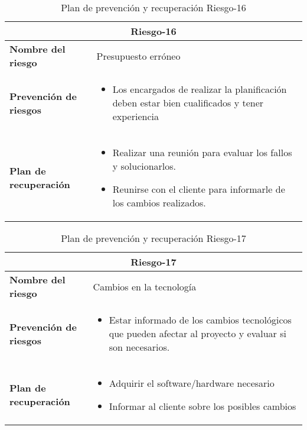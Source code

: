 \begin{table}[H]
\begin{center}
\begin{tabular}{p{} p{10cm}}
\multicolumn{2}{c}{\textbf{Riesgo-16} } \\
\hline \hline
\textbf{Nombre del riesgo} & Presupuesto erróneo  \\
\hline
\textbf{Prevención de riesgos} & \begin{itemize}[-]
  \item Los encargados de realizar la planificación deben estar bien cualificados y tener experiencia
  \end{itemize} \\
\hline
\textbf{Plan de recuperación} &   \begin{itemize}[-]
  \item Realizar una reunión para evaluar los fallos y solucionarlos.
  \item Reunirse con el cliente para informarle de los cambios realizados.
  \end{itemize}\\
\hline
\end{tabular}
\caption{Plan de prevención y recuperación Riesgo-16}
\label{tab:Riesgo-16-Prev_Recup}
\end{center}
\end{table}

\begin{table}[H]
\begin{center}
\begin{tabular}{p{} p{10cm}}
\multicolumn{2}{c}{\textbf{Riesgo-17} } \\
\hline \hline
\textbf{Nombre del riesgo} & Cambios en la tecnología \\
\hline
\textbf{Prevención de riesgos} & \begin{itemize}[-]
  \item Estar informado de los cambios tecnológicos que pueden afectar al proyecto y evaluar si son necesarios.
  \end{itemize} \\
\hline
\textbf{Plan de recuperación} &   \begin{itemize}[-]
  \item Adquirir el software/hardware necesario
  \item Informar al cliente sobre los posibles cambios
  \end{itemize}\\
\hline
\end{tabular}
\caption{Plan de prevención y recuperación Riesgo-17}
\label{tab:Riesgo-17-Prev_Recup}
\end{center}
\end{table}

